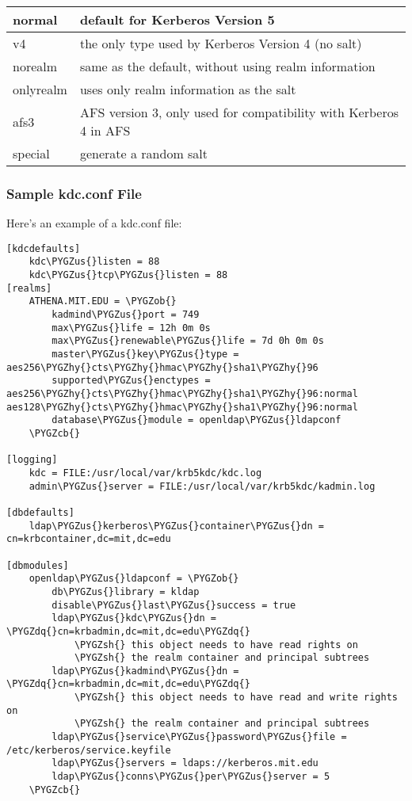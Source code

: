\documentclass[letterpaper,10pt,english]{sphinxmanual}
\def\PYGZus{\char`\_}
\def\PYGZob{\char`\{}
\def\PYGZcb{\char`\}}
\def\PYGZsh{\char`\#}
\def\PYGZhy{\char`\-}
\def\PYGZdq{\char`\"}
\begin{document}
\begin{tabulary}{\linewidth}{|L|L|}
\hline

normal
 & 
default for Kerberos Version 5
\\
\hline
v4
 & 
the only type used by Kerberos Version 4 (no salt)
\\
\hline
norealm
 & 
same as the default, without using realm information
\\
\hline
onlyrealm
 & 
uses only realm information as the salt
\\
\hline
afs3
 & 
AFS version 3, only used for compatibility with Kerberos 4 in AFS
\\
\hline
special
 & 
generate a random salt
\\
\hline\end{tabulary}



\subsubsection{Sample kdc.conf File}
\label{admin/conf_files/kdc_conf:sample-kdc-conf-file}
Here's an example of a kdc.conf file:

\begin{Verbatim}[commandchars=\\\{\}]
[kdcdefaults]
    kdc\PYGZus{}listen = 88
    kdc\PYGZus{}tcp\PYGZus{}listen = 88
[realms]
    ATHENA.MIT.EDU = \PYGZob{}
        kadmind\PYGZus{}port = 749
        max\PYGZus{}life = 12h 0m 0s
        max\PYGZus{}renewable\PYGZus{}life = 7d 0h 0m 0s
        master\PYGZus{}key\PYGZus{}type = aes256\PYGZhy{}cts\PYGZhy{}hmac\PYGZhy{}sha1\PYGZhy{}96
        supported\PYGZus{}enctypes = aes256\PYGZhy{}cts\PYGZhy{}hmac\PYGZhy{}sha1\PYGZhy{}96:normal aes128\PYGZhy{}cts\PYGZhy{}hmac\PYGZhy{}sha1\PYGZhy{}96:normal
        database\PYGZus{}module = openldap\PYGZus{}ldapconf
    \PYGZcb{}

[logging]
    kdc = FILE:/usr/local/var/krb5kdc/kdc.log
    admin\PYGZus{}server = FILE:/usr/local/var/krb5kdc/kadmin.log

[dbdefaults]
    ldap\PYGZus{}kerberos\PYGZus{}container\PYGZus{}dn = cn=krbcontainer,dc=mit,dc=edu

[dbmodules]
    openldap\PYGZus{}ldapconf = \PYGZob{}
        db\PYGZus{}library = kldap
        disable\PYGZus{}last\PYGZus{}success = true
        ldap\PYGZus{}kdc\PYGZus{}dn = \PYGZdq{}cn=krbadmin,dc=mit,dc=edu\PYGZdq{}
            \PYGZsh{} this object needs to have read rights on
            \PYGZsh{} the realm container and principal subtrees
        ldap\PYGZus{}kadmind\PYGZus{}dn = \PYGZdq{}cn=krbadmin,dc=mit,dc=edu\PYGZdq{}
            \PYGZsh{} this object needs to have read and write rights on
            \PYGZsh{} the realm container and principal subtrees
        ldap\PYGZus{}service\PYGZus{}password\PYGZus{}file = /etc/kerberos/service.keyfile
        ldap\PYGZus{}servers = ldaps://kerberos.mit.edu
        ldap\PYGZus{}conns\PYGZus{}per\PYGZus{}server = 5
    \PYGZcb{}
\end{Verbatim}
\end{document}
